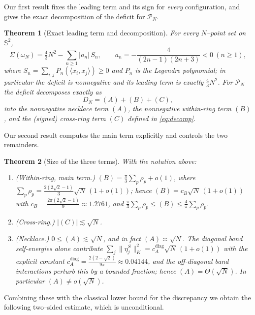 \documentclass[11pt,reqno]{amsart}
\newtheorem{theorem}{Theorem}[section]
\theoremstyle{definition}
\newcommand{\Sph}{\mathbb{S}^2}
\newcommand{\PN}{\mathcal{P}_N}
\newcommand{\Leg}{P}                      %
\newcommand{\inner}[2]{\langle #1,#2\rangle}
\newcommand{\abs}[1]{\lvert #1\rvert}
\newcommand{\Def}{D_N}
\newcommand{\rp}{\rho}
\begin{document}
Our first result fixes the leading term and its sign for \emph{every} configuration, and gives the
exact decomposition of the deficit for $\PN$.

\begin{theorem}[Exact leading term and decomposition]\label{thm:decomp}
For every $N$--point set on $\Sph$,
\[
   \Sigma(\omega_N)=\tfrac43N^2-\sum_{n\ge1}\abs{a_n}\,S_n,\qquad
   a_n=-\frac{4}{(2n-1)(2n+3)}<0\ (n\ge1),
\]
where $S_n=\sum_{i,j}\Leg_n(\inner{x_i}{x_j})\ge 0$ and $\Leg_n$ is the Legendre polynomial; in
particular the deficit is nonnegative and its leading term is exactly $\tfrac43N^2$.
For $\PN$ the deficit decomposes exactly as
\[
   \Def=(A)+(B)+(C),
\]
into the nonnegative \emph{necklace} term $(A)$, the nonnegative \emph{within-ring} term $(B)$, and
the (signed) \emph{cross-ring} term $(C)$ defined in \eqref{eq:decomp}.
\end{theorem}

Our second result computes the main term explicitly and controls the two remainders.

\begin{theorem}[Size of the three terms]\label{thm:sizes}
With the notation above:
\begin{enumerate}[leftmargin=2.2em,itemsep=3pt]
\item \textup{(Within-ring, main term.)} $\displaystyle (B)=\frac{\pi}{3}\sum_{p}\rp_p+o(1)$, where
      $\displaystyle \sum_p\rp_p=\frac{2(2\sqrt2-1)}{3}\sqrt N\,(1+o(1))$; hence
      $(B)=c_B\sqrt N\,(1+o(1))$ with $c_B=\frac{2\pi(2\sqrt2-1)}{9}\approx1.2761$, and
      $\frac{\pi}{3}\sum_p\rp_p\le (B)\le\frac{4}{\pi}\sum_p\rp_p$.
\item \textup{(Cross-ring.)} $\abs{(C)}\lesssim\sqrt N$.
\item \textup{(Necklace.)} $0\le (A)\lesssim\sqrt N$, and in fact $(A)\asymp\sqrt N$. The diagonal
      band self-energies alone contribute $\sum_j\lVert\eta_j^{S}\rVert_K^2=c_A^{\mathrm{diag}}\sqrt
      N\,(1+o(1))$ with the explicit constant $c_A^{\mathrm{diag}}=\frac{2(2-\sqrt2)}{9\pi}\approx
      0.04144$, and the off-diagonal band interactions perturb this by a bounded fraction; hence
      $(A)=\Theta(\sqrt N)$. In particular $(A)\ne o(\sqrt N)$.
\end{enumerate}
\end{theorem}

Combining these with the classical lower bound for the discrepancy we obtain the following
two--sided estimate, which is unconditional.
\end{document}
